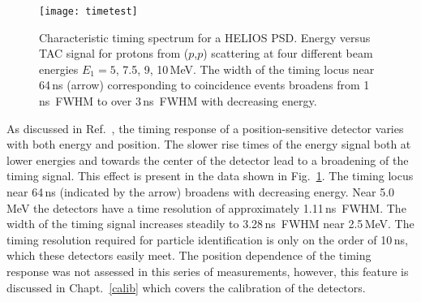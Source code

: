 \begin{figure}%
\centering
\texttt{[image: timetest]}%
\caption[Characteristic timing spectrum for a HELIOS PSD]{Characteristic timing spectrum for a HELIOS PSD. Energy versus TAC signal for protons from ($p$,$p$) scattering at four different beam energies $E_1=5$, 7.5, 9, 10\,MeV.  The width of the timing locus near 64\,ns (arrow) corresponding to coincidence events broadens from 1\,ns~FWHM to over 3\,ns~FWHM with decreasing energy.}%
\label{time_tests}%
\end{figure}

As discussed in Ref.~\cite{Bennett_1992}, the timing response of a position-sensitive detector varies with both energy and position.  The slower rise times of the energy signal both at lower energies and towards the center of the detector lead to a broadening of the timing signal.  This effect is present in the data shown in Fig.~\ref{time_tests}.  The timing locus near 64\,ns (indicated by the arrow) broadens with decreasing energy. Near 5.0\,MeV the detectors have a time resolution of approximately 1.11\,ns~FWHM.  The width of the timing signal increases steadily to 3.28\,ns~FWHM near 2.5\,MeV.  The timing resolution required for particle identification is only on the order of 10\,ns, which these detectors easily meet.  The position dependence of the timing response was not assessed in this series of measurements, however, this feature is discussed in Chapt.~\ref{calib} which covers the calibration of the detectors.

